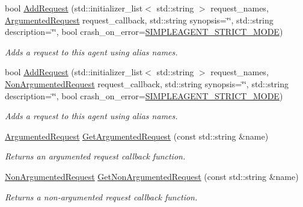 \begin{DoxyCompactItemize}
bool \hyperlink{classcubesat_1_1SimpleAgent_a58d44d4af7252d0ac0a661b6867be5db}{Add\+Request} (std\+::initializer\+\_\+list$<$ std\+::string $>$ request\+\_\+names, \hyperlink{namespacecubesat_a4fb5bf4788a49408c2c979bb82ae4fe1}{Argumented\+Request} request\+\_\+callback, std\+::string synopsis=\char`\"{}\char`\"{}, std\+::string description=\char`\"{}\char`\"{}, bool crash\+\_\+on\+\_\+error=\hyperlink{SimpleAgent_8h_ae0458b189260d62b7f199e0324dc3cc4}{S\+I\+M\+P\+L\+E\+A\+G\+E\+N\+T\+\_\+\+S\+T\+R\+I\+C\+T\+\_\+\+M\+O\+DE})
\begin{DoxyCompactList}\small\item\em Adds a request to this agent using alias names. \end{DoxyCompactList}\item 
bool \hyperlink{classcubesat_1_1SimpleAgent_a8c69a33729731b63bb0731c4f23a42c7}{Add\+Request} (std\+::initializer\+\_\+list$<$ std\+::string $>$ request\+\_\+names, \hyperlink{namespacecubesat_a494b2feec3d999510e5772da5c0b354c}{Non\+Argumented\+Request} request\+\_\+callback, std\+::string synopsis=\char`\"{}\char`\"{}, std\+::string description=\char`\"{}\char`\"{}, bool crash\+\_\+on\+\_\+error=\hyperlink{SimpleAgent_8h_ae0458b189260d62b7f199e0324dc3cc4}{S\+I\+M\+P\+L\+E\+A\+G\+E\+N\+T\+\_\+\+S\+T\+R\+I\+C\+T\+\_\+\+M\+O\+DE})
\begin{DoxyCompactList}\small\item\em Adds a request to this agent using alias names. \end{DoxyCompactList}\item 
\hyperlink{namespacecubesat_a4fb5bf4788a49408c2c979bb82ae4fe1}{Argumented\+Request} \hyperlink{classcubesat_1_1SimpleAgent_a37b37805a71a3fd9bb424e2abcd1851a}{Get\+Argumented\+Request} (const std\+::string \&name)
\begin{DoxyCompactList}\small\item\em Returns an argumented request callback function. \end{DoxyCompactList}\item 
\hyperlink{namespacecubesat_a494b2feec3d999510e5772da5c0b354c}{Non\+Argumented\+Request} \hyperlink{classcubesat_1_1SimpleAgent_afc59dc5e0fae3f21da25a1bfa89e4758}{Get\+Non\+Argumented\+Request} (const std\+::string \&name)
\begin{DoxyCompactList}\small\item\em Returns a non-\/argumented request callback function. \end{DoxyCompactList}\item 

\end{DoxyCompactItemize}
